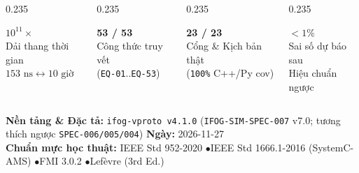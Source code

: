 \documentclass[aspectratio=169,8pt]{beamer}
\newcommand{\DocVersion}{v4.1.0}
\newcommand{\DocDate}{2026-11-27}
\begin{document}
\begin{frame}[plain]
\vspace{1.35cm}
\begin{columns}[T]
  \begin{column}{0.235\textwidth}
    \begin{tcolorbox}[colback=AcadNavy!90!black,colframe=AcadTeal!80,arc=2pt,boxrule=0.5pt,left=6pt,right=6pt,top=4pt,bottom=4pt]
      {\large\bfseries\color{white} $10^{11}\times$}\\[-1pt]
      {\scriptsize\color{AcadTealBg} Dải thang thời gian\\$153\text{ ns} \leftrightarrow 10\text{ giờ}$}
    \end{tcolorbox}
  \end{column}
  \begin{column}{0.235\textwidth}
    \begin{tcolorbox}[colback=AcadNavy!90!black,colframe=AcadTeal!80,arc=2pt,boxrule=0.5pt,left=6pt,right=6pt,top=4pt,bottom=4pt]
      {\large\bfseries\color{white} 53 / 53}\\[-1pt]
      {\scriptsize\color{AcadTealBg} Công thức truy vết\\(\texttt{EQ-01}..\texttt{EQ-53})}
    \end{tcolorbox}
  \end{column}
  \begin{column}{0.235\textwidth}
    \begin{tcolorbox}[colback=AcadNavy!90!black,colframe=AcadTeal!80,arc=2pt,boxrule=0.5pt,left=6pt,right=6pt,top=4pt,bottom=4pt]
      {\large\bfseries\color{white} 23 / 23}\\[-1pt]
      {\scriptsize\color{AcadTealBg} Cổng \& Kịch bản thật\\(\texttt{100\%} C++/Py cov)}
    \end{tcolorbox}
  \end{column}
  \begin{column}{0.235\textwidth}
    \begin{tcolorbox}[colback=AcadNavy!90!black,colframe=AcadTeal!80,arc=2pt,boxrule=0.5pt,left=6pt,right=6pt,top=4pt,bottom=4pt]
      {\large\bfseries\color{white} $< 1\%$}\\[-1pt]
      {\scriptsize\color{AcadTealBg} Sai số dự báo sau\\Hiệu chuẩn ngược}
    \end{tcolorbox}
  \end{column}
\end{columns}

\vspace{0.55cm}
{\scriptsize\color{white!75!gray}
\textbf{Nền tảng \& Đặc tả:} \texttt{ifog-vproto \DocVersion} (\texttt{IFOG-SIM-SPEC-007} v7.0; tương thích ngược \texttt{SPEC-006/005/004}) \hfill \textbf{Ngày:} \DocDate\\
\textbf{Chuẩn mực học thuật:} IEEE Std 952-2020 \enspace$\bullet$\enspace IEEE Std 1666.1-2016 (SystemC-AMS) \enspace$\bullet$\enspace FMI 3.0.2 \enspace$\bullet$\enspace Lefèvre (3rd Ed.)
}
\end{frame}
\end{document}
